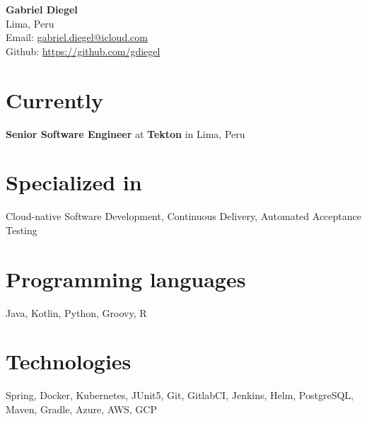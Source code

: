 \documentclass[9pt, a4paper]{extarticle}
\begin{document}
{\bf \LARGE Gabriel Diegel}\\[0.1cm]
Lima, Peru\\[0.1cm]
Email: \href{mailto:gabriel.diegel@icloud.com}{gabriel.diegel@icloud.com}\\[0.1cm]
Github: \href{https://github.com/gdiegel}{https://github.com/gdiegel}\\

\section*{Currently}
{\bf Senior Software Engineer} at {\bf Tekton} in Lima, Peru

\section*{Specialized in}
Cloud-native Software Development, Continuous Delivery, Automated Acceptance Testing

\section*{Programming languages}
Java, Kotlin, Python, Groovy, R

\section*{Technologies}
Spring, Docker, Kubernetes, JUnit5, Git, GitlabCI, Jenkins, Helm, PostgreSQL, Maven, Gradle, Azure, AWS, GCP
\end{document}
